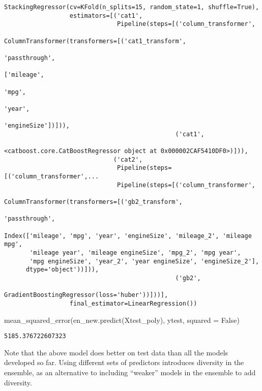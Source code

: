 \documentclass[
  letterpaper,
  DIV=11,
  numbers=noendperiod]{scrreprt}
\newenvironment{Shaded}{\begin{snugshade}}{\end{snugshade}}
\newcommand{\NormalTok}[1]{\textcolor[rgb]{0.00,0.23,0.31}{#1}}
\newcommand{\OperatorTok}[1]{\textcolor[rgb]{0.37,0.37,0.37}{#1}}
\newcommand{\VariableTok}[1]{\textcolor[rgb]{0.07,0.07,0.07}{#1}}
\begin{document}
\begin{verbatim}
StackingRegressor(cv=KFold(n_splits=15, random_state=1, shuffle=True),
                  estimators=[('cat1',
                               Pipeline(steps=[('column_transformer',
                                                ColumnTransformer(transformers=[('cat1_transform',
                                                                                 'passthrough',
                                                                                 ['mileage',
                                                                                  'mpg',
                                                                                  'year',
                                                                                  'engineSize'])])),
                                               ('cat1',
                                                <catboost.core.CatBoostRegressor object at 0x000002CAF5410DF0>)])),
                              ('cat2',
                               Pipeline(steps=[('column_transformer',...
                               Pipeline(steps=[('column_transformer',
                                                ColumnTransformer(transformers=[('gb2_transform',
                                                                                 'passthrough',
                                                                                 Index(['mileage', 'mpg', 'year', 'engineSize', 'mileage_2', 'mileage mpg',
       'mileage year', 'mileage engineSize', 'mpg_2', 'mpg year',
       'mpg engineSize', 'year_2', 'year engineSize', 'engineSize_2'],
      dtype='object'))])),
                                               ('gb2',
                                                GradientBoostingRegressor(loss='huber'))]))],
                  final_estimator=LinearRegression())
\end{verbatim}

\begin{Shaded}
\begin{Highlighting}[]
\NormalTok{mean\_squared\_error(en\_new.predict(Xtest\_poly), ytest, squared }\OperatorTok{=} \VariableTok{False}\NormalTok{)}
\end{Highlighting}
\end{Shaded}

\begin{verbatim}
5185.376722607323
\end{verbatim}

Note that the above model does better on test data than all the models
developed so far. Using different sets of predictors introduces
diversity in the ensemble, as an alternative to including ``weaker''
models in the ensemble to add diversity.
\end{document}
